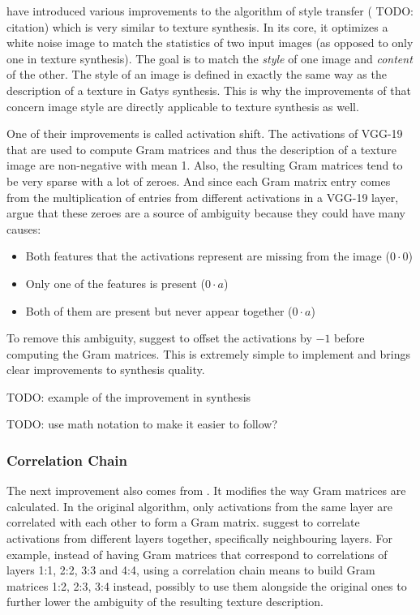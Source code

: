 \citet{Novak2016} have introduced various improvements to the algorithm of style transfer ({\color{red} TODO: citation}) which is very similar to texture synthesis. In its core, it optimizes a white noise image to match the statistics of two input images (as opposed to only one in texture synthesis). The goal is to match the \textit{style} of one image and \textit{content} of the other. The style of an image is defined in exactly the same way as the description of a texture in Gatys synthesis. This is why the improvements of \citet{Novak2016} that concern image style are directly applicable to texture synthesis as well.

One of their improvements is called activation shift. The activations of VGG-19 that are used to compute Gram matrices and thus the description of a texture image are non-negative with mean 1. Also, the resulting Gram matrices tend to be very sparse with a lot of zeroes. And since each Gram matrix entry comes from the multiplication of entries from different activations in a VGG-19 layer, \citet{Novak2016} argue that these zeroes are a source of ambiguity because they could have many causes:

\begin{itemize}
    \item Both features that the activations represent are missing from the image (\(0 \cdot 0\))
    \item Only one of the features is present (\(0 \cdot a\))
    \item Both of them are present but never appear together (\(0 \cdot a\))
\end{itemize}

To remove this ambiguity, \citet{Novak2016} suggest to offset the activations by \(-1\) before computing the Gram matrices. This is extremely simple to implement and brings clear improvements to synthesis quality.

{\color{red} TODO: example of the improvement in synthesis}

{\color{red} TODO: use math notation to make it easier to follow?}

\subsubsection{Correlation Chain}
\label{section:methods-texture_model-improvements-correlation_chain}

The next improvement also comes from \citet{Novak2016}. It modifies the way Gram matrices are calculated. In the original algorithm, only activations from the same layer are correlated with each other to form a Gram matrix. \citet{Novak2016} suggest to correlate activations from different layers together, specifically neighbouring layers. For example, instead of having Gram matrices that correspond to correlations of layers 1:1, 2:2, 3:3 and 4:4, using a correlation chain means to build Gram matrices 1:2, 2:3, 3:4 instead, possibly to use them alongside the original ones to further lower the ambiguity of the resulting texture description.

